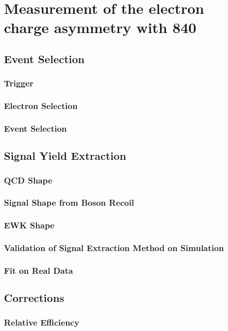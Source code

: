 \chapter{ 
Measurement of the electron charge asymmetry with \unit{840}{\invpb} }

\section{Event Selection}
\subsection{Trigger}
\subsection{Electron Selection}
\subsection{Event Selection}

\section{Signal Yield Extraction}
\subsection{QCD \ETm Shape}
\subsection{Signal \ETm Shape from Boson Recoil}
\subsection{EWK \ETm Shape}
\subsection{Validation of Signal Extraction Method on Simulation}
\subsection{Fit on Real Data}

\section{Corrections}
\subsection{Relative Efficiency}

